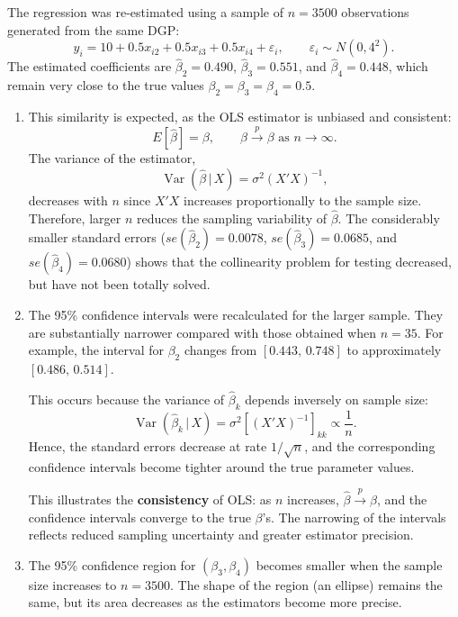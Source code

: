 
The regression was re-estimated using a sample of $n = 3500$ observations generated from the same DGP:
\[
y_i = 10 + 0.5x_{i2} + 0.5x_{i3} + 0.5x_{i4} + \varepsilon_i, 
\qquad \varepsilon_i \sim N(0,4^2).
\]
The estimated coefficients are $\hat{\beta}_2 = 0.490$, $\hat{\beta}_3 = 0.551$, and $\hat{\beta}_4 = 0.448$, 
which remain very close to the true values $\beta_2 = \beta_3 = \beta_4 = 0.5$.

\begin{enumerate}[label=(\roman*)]
\item 
This similarity is expected, as the OLS estimator is unbiased and consistent:
\[
E[\hat{\beta}] = \beta, \qquad 
\hat{\beta} \xrightarrow{p} \beta \text{ as } n \to \infty.
\]
The variance of the estimator,
\[
\operatorname{Var}(\hat{\beta}\,|\,X) = \sigma^2 (X'X)^{-1},
\]
decreases with $n$ since $X'X$ increases proportionally to the sample size.  Therefore, larger $n$ reduces the sampling variability of $\hat{\beta}$.  The considerably smaller standard errors  
($se(\hat{\beta}_2) = 0.0078$, $se(\hat{\beta}_3) = 0.0685$, and $se(\hat{\beta}_4) = 0.0680$) shows that the collinearity problem for testing decreased, but have not been totally solved. 

\item

The 95\% confidence intervals were recalculated for the larger sample.  
They are substantially narrower compared with those obtained when $n = 35$.  
For example, the interval for $\beta_2$ changes from $[0.443,\, 0.748]$ to approximately $[0.486,\, 0.514]$.  

\medskip
\noindent
This occurs because the variance of $\hat{\beta}_k$ depends inversely on sample size:
\[
\operatorname{Var}(\hat{\beta}_k \,|\, X) = \sigma^2 [(X'X)^{-1}]_{kk} \propto \frac{1}{n}.
\]
Hence, the standard errors decrease at rate $1/\sqrt{n}$, 
and the corresponding confidence intervals become tighter around the true parameter values.  

\medskip
\noindent
This illustrates the \textbf{consistency} of OLS: as $n$ increases, $\hat{\beta} \xrightarrow{p} \beta$, 
and the confidence intervals converge to the true $\beta$’s.  
The narrowing of the intervals reflects reduced sampling uncertainty and greater estimator precision.

\item

The 95\% confidence region for $(\beta_3, \beta_4)$ becomes smaller when the sample size increases to $n = 3500$.  
The shape of the region (an ellipse) remains the same, but its area decreases as the estimators become more precise.  


\end{enumerate}
